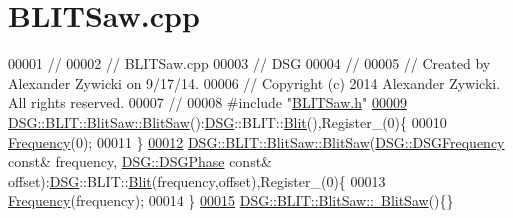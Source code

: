 \hypertarget{_b_l_i_t_saw_8cpp_source}{\section{B\+L\+I\+T\+Saw.\+cpp}
\label{_b_l_i_t_saw_8cpp_source}
}

\begin{DoxyCode}
00001 \textcolor{comment}{//}
00002 \textcolor{comment}{//  BLITSaw.cpp}
00003 \textcolor{comment}{//  DSG}
00004 \textcolor{comment}{//}
00005 \textcolor{comment}{//  Created by Alexander Zywicki on 9/17/14.}
00006 \textcolor{comment}{//  Copyright (c) 2014 Alexander Zywicki. All rights reserved.}
00007 \textcolor{comment}{//}
00008 \textcolor{preprocessor}{#include "\hyperlink{_b_l_i_t_saw_8h}{BLITSaw.h}"}
\hypertarget{_b_l_i_t_saw_8cpp_source_l00009}{}\hyperlink{class_d_s_g_1_1_b_l_i_t_1_1_blit_saw_a5c73a4aeb4df74da4db4896edeb15059}{00009} \hyperlink{class_d_s_g_1_1_b_l_i_t_1_1_blit_saw_a5c73a4aeb4df74da4db4896edeb15059}{DSG::BLIT::BlitSaw::BlitSaw}():\hyperlink{namespace_d_s_g}{DSG}::BLIT::\hyperlink{class_d_s_g_1_1_b_l_i_t_1_1_blit}{Blit}(),Register\_(0)\{
00010     \hyperlink{class_d_s_g_1_1_signal_generator_a4e6b3c43e76e53f8cd337ad699c464cb}{Frequency}(0);
00011 \}
\hypertarget{_b_l_i_t_saw_8cpp_source_l00012}{}\hyperlink{class_d_s_g_1_1_b_l_i_t_1_1_blit_saw_a3d7e4379c00970fa89085ed2c945a2b7}{00012} \hyperlink{class_d_s_g_1_1_b_l_i_t_1_1_blit_saw_a5c73a4aeb4df74da4db4896edeb15059}{DSG::BLIT::BlitSaw::BlitSaw}(\hyperlink{namespace_d_s_g_a4315a061386fa1014fda09b15d3a6973}{DSG::DSGFrequency} \textcolor{keyword}{const}& frequency,
      \hyperlink{namespace_d_s_g_a44431ce1eb0a7300efdd207bc879e52c}{DSG::DSGPhase} \textcolor{keyword}{const}& offset):\hyperlink{namespace_d_s_g}{DSG}::BLIT::\hyperlink{class_d_s_g_1_1_b_l_i_t_1_1_blit}{Blit}(frequency,offset),Register\_(0)\{
00013     \hyperlink{class_d_s_g_1_1_signal_generator_a4e6b3c43e76e53f8cd337ad699c464cb}{Frequency}(frequency);
00014 \}
\hypertarget{_b_l_i_t_saw_8cpp_source_l00015}{}\hyperlink{class_d_s_g_1_1_b_l_i_t_1_1_blit_saw_a4744c63b29aee896823f19965e11e515}{00015} \hyperlink{class_d_s_g_1_1_b_l_i_t_1_1_blit_saw_a4744c63b29aee896823f19965e11e515}{DSG::BLIT::BlitSaw::~BlitSaw}()\{\}
\end{DoxyCode}
